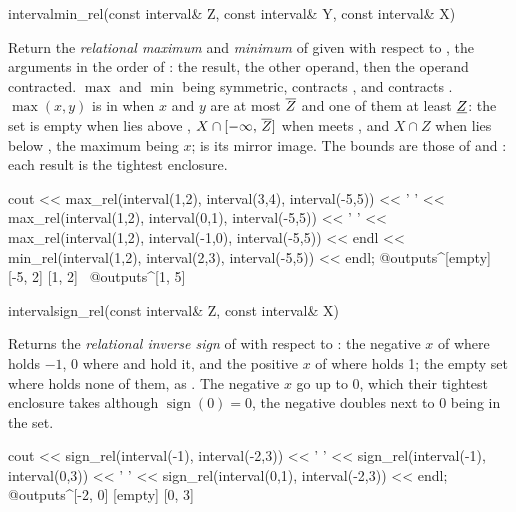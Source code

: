 \documentclass[12pt,a4paper,twoside,openright]{book}
\begin{document}
\begin{deffun}{interval}{min\_rel}{(const interval\& Z, const interval\& Y, const interval\& X)}
  \begin{operation}
  \end{operation}
  Return the \emph{relational maximum} and \emph{minimum} of  given
   with respect to , the arguments in the order of
  : the result, the other operand, then the operand
  contracted. $\max$ and $\min$ being symmetric, 
  contracts , and  contracts .
  $\max(x,y)$ is in  when $x$ and $y$ are at most $\overline{Z}$
  and one of them at least $\underline{Z}$: the set is empty when 
  lies above , $X\cap[-\infty,\,\overline{Z}]$ when 
  meets , and $X\cap Z$ when  lies below , the maximum
  being $x$;  is its mirror image. The bounds are those of
   and : each result is the tightest enclosure.\newinvfive
\begin{example}
cout << max_rel(interval(1,2), interval(3,4), interval(-5,5)) << ' '
     << max_rel(interval(1,2), interval(0,1), interval(-5,5)) << ' '
     << max_rel(interval(1,2), interval(-1,0), interval(-5,5)) << endl
     << min_rel(interval(1,2), interval(2,3), interval(-5,5)) << endl;
@outputs^[empty] [-5, 2] [1, 2]~
@outputs^[1, 5]~
\end{example}
\end{deffun}

\begin{deffun}{interval}{sign\_rel}{(const interval\& Z, const interval\& X)}
  \begin{operation}
  \end{operation}
  Returns the \emph{relational inverse sign} of  with respect to
  : the negative $x$ of  where  holds $-1$, 0 where
   and  hold it, and the positive $x$ of  where 
  holds 1; the empty set where  holds none of them, as
  . The negative $x$ go up to 0, which their tightest
  enclosure takes although $\operatorname{sign}(0)=0$, the negative doubles
  next to 0 being in the set.\newinvfive
\begin{example}
cout << sign_rel(interval(-1), interval(-2,3)) << ' '
     << sign_rel(interval(-1), interval(0,3)) << ' '
     << sign_rel(interval(0,1), interval(-2,3)) << endl;
@outputs^[-2, 0] [empty] [0, 3]~
\end{example}
\end{deffun}
\end{document}
